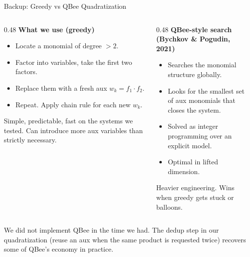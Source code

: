 \documentclass[aspectratio=169,10pt]{beamer}
\begin{document}
\begin{frame}{Backup: Greedy vs QBee Quadratization}
  \begin{columns}[T]
    \begin{column}{0.48\textwidth}
      \textbf{What we use (greedy)}
      \begin{itemize}\setlength\itemsep{0pt}
        \item Locate a monomial of degree $> 2$.
        \item Factor into variables, take the first two factors.
        \item Replace them with a fresh aux $w_k = f_1 \cdot f_2$.
        \item Repeat. Apply chain rule for each new $w_k$.
      \end{itemize}
      Simple, predictable, fast on the systems we tested. Can introduce more aux variables than strictly necessary.
    \end{column}
    \begin{column}{0.48\textwidth}
      \textbf{QBee-style search (Bychkov \& Pogudin, 2021)}
      \begin{itemize}\setlength\itemsep{0pt}
        \item Searches the monomial structure globally.
        \item Looks for the smallest set of aux monomials that closes the system.
        \item Solved as integer programming over an explicit model.
        \item Optimal in lifted dimension.
      \end{itemize}
      Heavier engineering. Wins when greedy gets stuck or balloons.
    \end{column}
  \end{columns}

  \medskip
  We did not implement QBee in the time we had. The dedup step in our quadratization (reuse an aux when the same product is requested twice) recovers some of QBee's economy in practice.
\end{frame}
\end{document}
